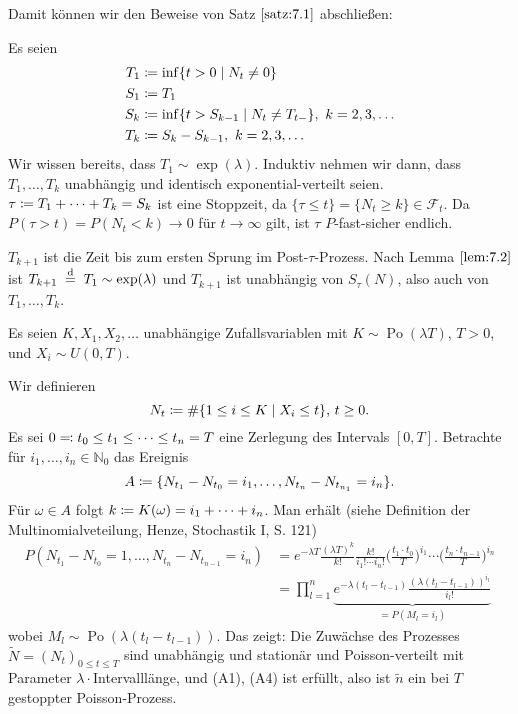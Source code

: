 \documentclass[a4paper,twoside,DIV15,BCOR12mm]{scrbook}
\newcommand{\cF}{\mathcal F}
\begin{document}
Damit können wir den Beweise von Satz $\ref{satz:7.1}$ abschließen:

Es seien
\begin{align*}
T_1 &\da \inf\{t>0\mid N_t\ne 0\} \\
S_1 &\da T_1 \\
S_k &\da \inf\{t>S_{k-1} \mid N_t \ne T_{t-}\},\ k=2,3,\ldots\\
T_k &\da S_k - S_{k-1},\ k=2,3,\dots
\end{align*}
Wir wissen bereits, dass $T_1 \sim \exp(\lambda)$. Induktiv nehmen wir dann, dass $T_1,\ldots,T_k$ unabhängig und identisch exponential-verteilt seien. $\tau \da T_1 + \cdots + T_k = S_k$ ist eine Stoppzeit, da $\{\tau \le t\} = \{N_t \ge k\} \in \cF_t$. Da $P(\tau > t)= P(N_t < k) \to 0$ für $t\to\infty$ gilt, ist $\tau$ $P$-fast-sicher endlich.

$T_{k+1}$ ist die Zeit bis zum ersten Sprung im Post-$\tau$-Prozess. Nach Lemma $\ref{lem:7.2}$ ist $T_{k+1}\gleichnach{d} T_1\sim \exp(\lambda)$ und $T_{k+1}$ ist unabhängig von $S_\tau(N)$, also auch von $T_1,\ldots,T_k$.

\begin{beispiel}
Es seien $K,X_1,X_2,\ldots$ unabhängige Zufallsvariablen mit $K\sim \operatorname{Po}(\lambda T)$, $T>0$, und $X_i\sim U(0,T)$.

Wir definieren\[
N_t \da \#\{1\le i \le K\mid X_i\le t\},\, t\ge 0.
\]
Es sei $0\ad t_0\le t_1 \le \cdots\le t_n=T$ eine Zerlegung des Intervals $[0,T]$. Betrachte für $i_1,\ldots,i_n\in \mathbb N_0$ das Ereignis
\[
A \da \{N_{t_1} - N_{t_0} = i_1,\ldots,N_{t_n}-N_{t_{n_1}} = i_n\}.
\]
Für $\omega \in A$ folgt $k \da K(\omega) = i_1+\cdots+ i_n$. Man erhält (siehe Definition der Multinomialveteilung, Henze, Stochastik I, S. 121)
\begin{align*}
P(N_{t_1} - N_{t_0}=1,\ldots,N_{t_n} - N_{t_{n-1}} = i_n) 
&= e^{-\lambda T}\frac{(\lambda T)^k}{k!} \frac{k!}{i_1!\cdots i_n!}\Big(\frac{t_1\cdot t_0}{T}\Big)^{i_1}\cdots \Big(\frac{t_n\cdot t_{n-1}}{T}\Big)^{i_n} \\
&= \prod_{l=1}^n \underbrace{e^{-\lambda(t_l-t_{l-1})} \frac{(\lambda (t_l - t_{l-1}))^{i_l}}{i_l!}}_{=P(M_l=i_l)}
\end{align*}
wobei $M_l\sim \operatorname{Po}(\lambda(t_l-t_{l-1}))$. Das zeigt: Die Zuwächse des Prozesses $\tilde N=(N_t)_{0\le t\le T}$ sind unabhängig und stationär und Poisson-verteilt mit Parameter $\lambda\cdot$Intervalllänge, und (A1), (A4) ist erfüllt, also ist $\tilde n$ ein bei $T$ gestoppter Poisson-Prozess.
\end{beispiel}
\end{document}
